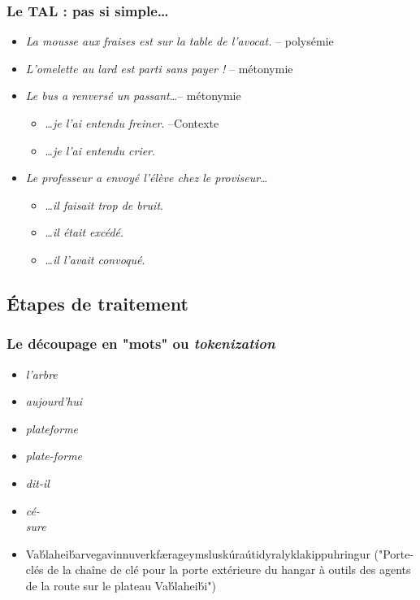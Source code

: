 \begin{frame}
\frametitle{Le TAL : pas si simple\ldots}
\begin{itemize}[<+->]
   \item \textit{La mousse aux fraises est sur la table de l’avocat.} -- polysémie
   \item \textit{L'omelette au lard est parti sans payer !} -- métonymie
   \item \textit{Le bus a renversé un passant}\ldots -- métonymie
   \begin{itemize}
      \item \ldots \textit{je l’ai entendu freiner}. --Contexte
      \item \ldots \textit{je l’ai entendu crier}.
   \end{itemize}
   \item \textit{Le professeur a envoyé l'élève chez le proviseur}\ldots
  \begin{itemize}
      \item \ldots \textit{il faisait trop de bruit}.
     \item \ldots \textit{il était excédé}.
     \item \ldots \textit{il l’avait convoqué}.
\end{itemize}
\end{itemize}

\bigskip
{}
\end{frame}
\subsection{\'Etapes de traitement}

\begin{frame}
\frametitle{Le découpage en "mots" ou \textit{tokenization}}
\begin{itemize}[<+->]
\item \textit{l’arbre} 
\item \textit{aujourd’hui} 
\end{itemize}
\begin{itemize}[<+->]
\item \textit{plateforme} 
\item \textit{plate-forme} 
\item \textit{dit-il} 
\item \textit{cé-\\sure} 
\pause
\item Va\'blahei\'barvegavinnuverkfærageymsluskúraútidyralyklakippuhringur ("Porte-clés de la chaîne de clé pour la porte extérieure du hangar à outils des agents de la route sur le plateau Va\'blahei\'bi") %

\end{itemize}

\end{frame}

